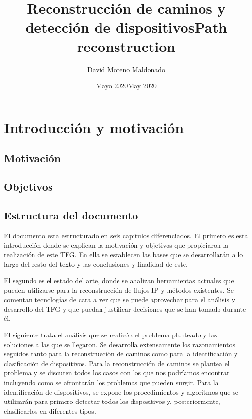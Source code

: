 \documentclass[twoside, 12pt]{epstfg}
\title[spa]{Reconstrucción de caminos y detección de dispositivos}
\title[eng]{Path reconstruction}
\author{David Moreno Maldonado}
\date[spa]{Mayo 2020}
\date[eng]{May 2020}
\begin{document}

\frontmatter

\maketitle[spa]

\makeinnertitle[spa]


\tableofcontents
\clearpage
\listoftables
\clearpage
\listoffigures
\cleardoublepage

\printnoidxglossaries

\mainmatter

\chapter{Introducción y motivación}

\section{Motivación}

\section{Objetivos}

\section{Estructura del documento}
El documento esta estructurado en seis capítulos diferenciados. El primero es esta introducción donde se explican la motivación y objetivos que propiciaron la realización de este TFG. En ella se establecen las bases que se desarrollarán a lo largo del resto del texto y las conclusiones y finalidad de este.

El segundo es el estado del arte, donde se analizan herramientas actuales que pueden utilizarse para la reconstrucción de flujos IP y métodos existentes. Se comentan tecnologías de cara a ver que se puede aprovechar para el análisis y desarrollo del TFG y que puedan justificar decisiones que se han tomado durante él.

El siguiente trata el análisis que se realizó del problema planteado y las soluciones a las que se llegaron. Se desarrolla extensamente los razonamientos seguidos tanto para la reconstrucción de caminos como para la identificación y clasificación de dispositivos. Para la reconstrucción de caminos se plantea el problema y se discuten todos los casos con los que nos podríamos encontrar incluyendo como se afrontarán los problemas que pueden surgir. Para la identificación de dispositivos, se expone los procedimientos y algoritmos que se utilizarán para primero detectar todos los dispositivos y, posteriormente, clasificarlos en diferentes tipos.
\end{document}
